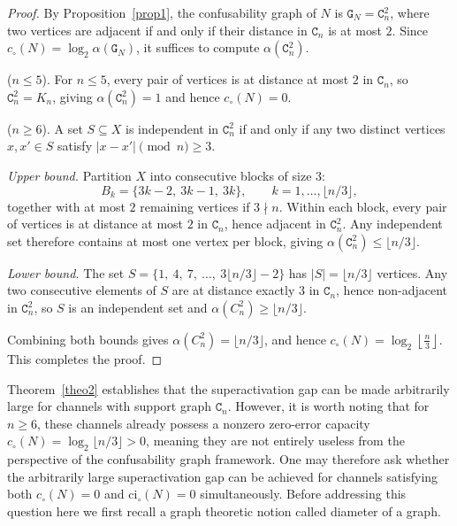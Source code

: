 \documentclass[12pt,a4paper]{article}
\begin{document}
\begin{proof}
By Proposition~\ref{prop1}, the confusability graph of $N$ is $\mathtt{G}_N =\mathtt{C}_n^2$, where two vertices are adjacent if and only if their distance in $\mathtt{C}_n$ is at most $2$. Since $c_\circ(N) =\log_2 \alpha(\mathtt{G}_N)$, it suffices to compute $\alpha(\mathtt{C}_n^2)$.

 ($n \leq 5$). For $n \leq 5$, every pair of vertices is at distance at most $2$ in $\mathtt{C}_n$, so $\mathtt{C}_n^2 = K_n$, giving $\alpha(\mathtt{C}_n^2) = 1$ and hence $c_\circ(N) = 0$.

 ($n \geq 6$). A set $S \subseteq X$ is independent in $\mathtt{C}_n^2$ if and only if any two distinct vertices $x, x' \in S$ satisfy $|x - x'| \pmod{n} \geq 3$.

\noindent\textit{Upper bound.} Partition $X$ into consecutive blocks of size $3$:
\begin{equation*}
B_k = \{3k-2,\ 3k-1,\ 3k\}, \qquad k = 1, \ldots, \lfloor n/3 \rfloor,
\end{equation*}
together with at most $2$ remaining vertices if $3 \nmid n$. Within each block, every pair of vertices is at distance at most $2$ in $\mathtt{C}_n$, hence adjacent in $\mathtt{C}_n^2$. Any independent set therefore contains at most one vertex per block, giving $\alpha(\mathtt{C}_n^2) \leq \lfloor n/3 \rfloor$.

\noindent\textit{Lower bound.} The set $S = \{1,\ 4,\ 7,\ \ldots,\ 3\lfloor n/3 \rfloor - 2\}$ has $|S| = \lfloor n/3 \rfloor$ vertices. Any two consecutive elements of $S$ are at distance exactly $3$ in $\mathtt{C}_n$, hence non-adjacent in $\mathtt{C}_n^2$, so $S$ is an independent set and $\alpha(C_n^2) \geq \lfloor n/3 \rfloor$.

\noindent Combining both bounds gives $\alpha(C_n^2) = \lfloor n/3 \rfloor$, and hence $c_\circ(N) = \log_2 \left\lfloor \frac{n}{3} \right\rfloor$. This completes the proof.
\end{proof}

\noindent Theorem~\ref{theo2} establishes that
the superactivation gap can be made arbitrarily large for channels with support graph $\mathtt{C}_n$. However, it is worth noting that for $n \geq 6$, these channels already possess a nonzero zero-error capacity $c_\circ(N)=\log_2 \lfloor n/3 \rfloor > 0$, meaning they are not entirely useless from the perspective of the confusability graph framework. One may therefore ask whether the arbitrarily large superactivation gap can be achieved for channels satisfying both $c_\circ(N) = 0$ and $\mathrm{ci}_\circ(N) = 0$ simultaneously. Before addressing this question here we first recall a graph theoretic notion called diameter of a graph.
\end{document}
